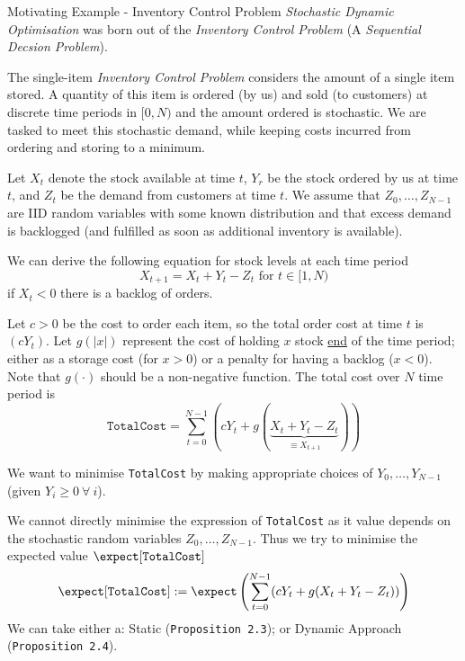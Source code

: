 \documentclass[11pt,a4paper]{article}
\begin{document}
  \begin{example}{Motivating Example - Inventory Control Problem}
    \textit{Stochastic Dynamic Optimisation} was born out of the \textit{Inventory Control Problem} (A \textit{Sequential Decsion Problem}).
    \par The single-item \textit{Inventory Control Problem} considers the amount of a single item stored. A quantity of this item is ordered (by us) and sold (to customers) at discrete time periods in $[0,N)$ and the amount ordered is stochastic. We are tasked to meet this stochastic demand, while keeping costs incurred from ordering and storing to a minimum.
    \par Let $X_t$ denote the stock available at time $t$, $Y_r$ be the stock ordered by us at time $t$, and $Z_t$ be the demand from customers at time $t$. We assume that $Z_0,\dots,Z_{N-1}$ are IID random variables with some known distribution and that excess demand is backlogged (and fulfilled as soon as additional inventory is available).
    \par We can derive the following equation for stock levels at each time period
    \[ X_{t+1}=X_t+Y_t-Z_t\text{ for }t\in[1,N)\]
    if $X_t<0$ there is a backlog of orders.
    \par Let $c>0$ be the cost to order each item, so the total order cost at time $t$ is $(cY_t)$. Let $g(|x|)$ represent the cost of holding $x$ stock \underline{end} of the time period; either as a storage cost (for $x>0$) or a penalty for having a backlog ($x<0$). Note that $g(\cdot)$ should be a non-negative function. The total cost over $N$ time period is
    \[ \mathtt{Total Cost}=\sum_{t=0}^{N-1}(cY_t+g(\underbrace{X_t+Y_t-Z_t}_{\equiv X_{t+1}})) \]
    \par We want to minimise \texttt{TotalCost} by making appropriate choices of $Y_0,\dots,Y_{N-1}$ (given $Y_i\geq0\ \forall\ i$).
    \par We cannot directly minimise the expression of \texttt{TotalCost} as it value depends on the stochastic random variables $Z_0,\dots,Z_{N-1}$. Thus we try to minimise the expected value $\expect[\mathtt{TotalCost}]$
    \[ \expect[\mathtt{TotalCost}]:=\expect\left(\sum_{t=0}^{N-1}(cY_t+g(X_t+Y_t-Z_t))\right) \]
    We can take either a: Static (\texttt{Proposition 2.3}); or Dynamic Approach (\texttt{Proposition 2.4}).
  \end{example}
\end{document}
